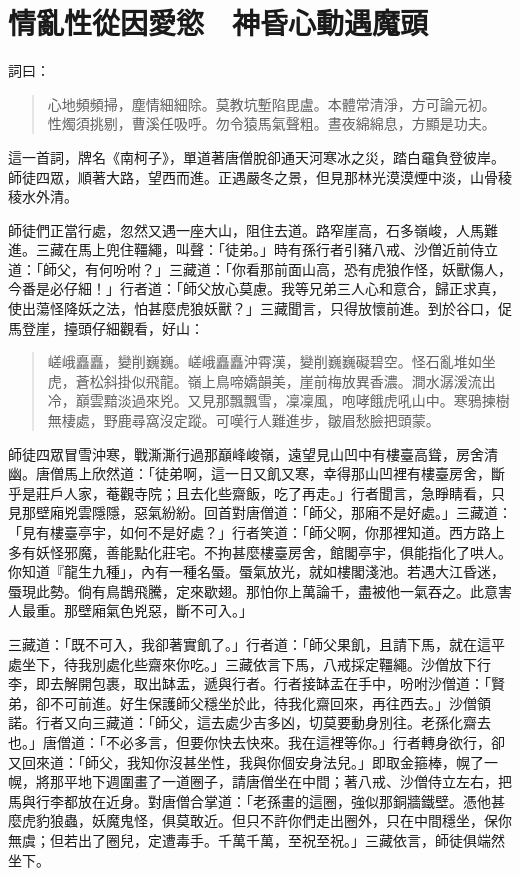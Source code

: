 
\chapter{情亂性從因愛慾　神昏心動遇魔頭}

詞曰：
\begin{quote}
心地頻頻掃，塵情細細除。莫教坑塹陷毘盧。本體常清淨，方可論元初。
性燭須挑剔，曹溪任吸呼。勿令猿馬氣聲粗。晝夜綿綿息，方顯是功夫。
\end{quote}

這一首詞，牌名《南柯子》，單道著唐僧脫卻通天河寒冰之災，踏白黿負登彼岸。師徒四眾，順著大路，望西而進。正遇嚴冬之景，但見那林光漠漠煙中淡，山骨稜稜水外清。

師徒們正當行處，忽然又遇一座大山，阻住去道。路窄崖高，石多嶺峻，人馬難進。三藏在馬上兜住韁繩，叫聲：「徒弟。」時有孫行者引豬八戒、沙僧近前侍立道：「師父，有何吩咐？」三藏道：「你看那前面山高，恐有虎狼作怪，妖獸傷人，今番是必仔細！」行者道：「師父放心莫慮。我等兄弟三人心和意合，歸正求真，使出蕩怪降妖之法，怕甚麼虎狼妖獸？」三藏聞言，只得放懷前進。到於谷口，促馬登崖，擡頭仔細觀看，好山：
\begin{quote}
嵯峨矗矗，變削巍巍。嵯峨矗矗沖霄漢，變削巍巍礙碧空。怪石亂堆如坐虎，蒼松斜掛似飛龍。嶺上鳥啼嬌韻美，崖前梅放異香濃。澗水潺湲流出冷，巔雲黯淡過來兇。又見那飄飄雪，凜凜風，咆哮餓虎吼山中。寒鴉揀樹無棲處，野鹿尋窩沒定蹤。可嘆行人難進步，皺眉愁臉把頭蒙。
\end{quote}

師徒四眾冒雪沖寒，戰澌澌行過那巔峰峻嶺，遠望見山凹中有樓臺高聳，房舍清幽。唐僧馬上欣然道：「徒弟啊，這一日又飢又寒，幸得那山凹裡有樓臺房舍，斷乎是莊戶人家，菴觀寺院；且去化些齋飯，吃了再走。」行者聞言，急睜睛看，只見那壁廂兇雲隱隱，惡氣紛紛。回首對唐僧道：「師父，那廂不是好處。」三藏道：「見有樓臺亭宇，如何不是好處？」行者笑道：「師父啊，你那裡知道。西方路上多有妖怪邪魔，善能點化莊宅。不拘甚麼樓臺房舍，館閣亭宇，俱能指化了哄人。你知道『龍生九種」，內有一種名蜃。蜃氣放光，就如樓閣淺池。若遇大江昏迷，蜃現此勢。倘有鳥鵲飛騰，定來歇翅。那怕你上萬論千，盡被他一氣吞之。此意害人最重。那壁廂氣色兇惡，斷不可入。」

三藏道：「既不可入，我卻著實飢了。」行者道：「師父果飢，且請下馬，就在這平處坐下，待我別處化些齋來你吃。」三藏依言下馬，八戒採定韁繩。沙僧放下行李，即去解開包裹，取出缽盂，遞與行者。行者接缽盂在手中，吩咐沙僧道：「賢弟，卻不可前進。好生保護師父穩坐於此，待我化齋回來，再往西去。」沙僧領諾。行者又向三藏道：「師父，這去處少吉多凶，切莫要動身別往。老孫化齋去也。」唐僧道：「不必多言，但要你快去快來。我在這裡等你。」行者轉身欲行，卻又回來道：「師父，我知你沒甚坐性，我與你個安身法兒。」即取金箍棒，幌了一幌，將那平地下週圍畫了一道圈子，請唐僧坐在中間；著八戒、沙僧侍立左右，把馬與行李都放在近身。對唐僧合掌道：「老孫畫的這圈，強似那銅牆鐵壁。憑他甚麼虎豹狼蟲，妖魔鬼怪，俱莫敢近。但只不許你們走出圈外，只在中間穩坐，保你無虞；但若出了圈兒，定遭毒手。千萬千萬，至祝至祝。」三藏依言，師徒俱端然坐下。

